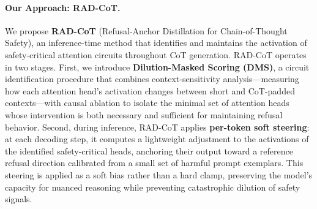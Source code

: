 \documentclass[11pt]{article}
\begin{document}
\paragraph{Our Approach: RAD-CoT.} We propose \textbf{RAD-CoT} (Refusal-Anchor Distillation for Chain-of-Thought Safety), an inference-time method that identifies and maintains the activation of safety-critical attention circuits throughout CoT generation. RAD-CoT operates in two stages. First, we introduce \textbf{Dilution-Masked Scoring (DMS)}, a circuit identification procedure that combines context-sensitivity analysis---measuring how each attention head's activation changes between short and CoT-padded contexts---with causal ablation to isolate the minimal set of attention heads whose intervention is both necessary and sufficient for maintaining refusal behavior. Second, during inference, RAD-CoT applies \textbf{per-token soft steering}: at each decoding step, it computes a lightweight adjustment to the activations of the identified safety-critical heads, anchoring their output toward a reference refusal direction calibrated from a small set of harmful prompt exemplars. This steering is applied as a soft bias rather than a hard clamp, preserving the model's capacity for nuanced reasoning while preventing catastrophic dilution of safety signals.
\end{document}
